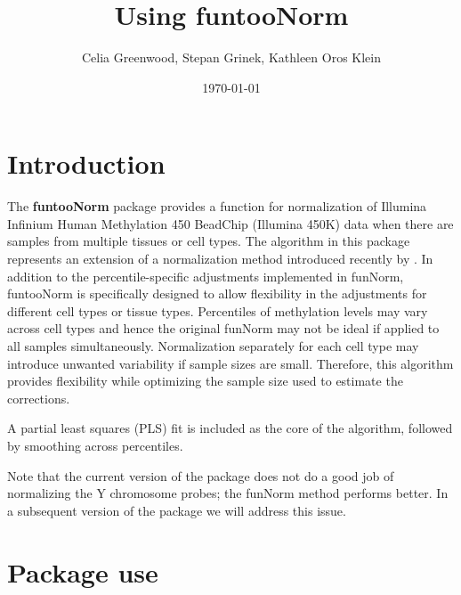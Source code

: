 \documentclass{article}
\title{Using funtooNorm}
\author{Celia Greenwood, Stepan Grinek, Kathleen Oros Klein}
\date{\today}
\begin{document}


\maketitle



\section{Introduction}


The \textbf{funtooNorm} package provides  a function for normalization of Illumina Infinium Human Methylation 450 BeadChip (Illumina 450K) data when there are samples from multiple tissues or cell types. 
The algorithm in this package represents an extension of a normalization method introduced recently by
\cite{Fortin2014, Aryee2014}. 
In addition to the percentile-specific adjustments implemented in funNorm, funtooNorm is specifically designed to allow flexibility in the adjustments for different cell types or tissue types.  
Percentiles of methylation levels may vary across cell types and hence the original funNorm may not be ideal if applied to all samples simultaneously.  
Normalization separately for each cell type may introduce unwanted variability if sample sizes are small.
Therefore, this algorithm provides flexibility while optimizing the sample size used to estimate the corrections.

A partial least squares (PLS) fit is included as the core of the algorithm, followed by smoothing across percentiles. 

Note that the current version of the package does not do a good job of normalizing the Y chromosome probes; the funNorm method performs better.  
In a subsequent version of the package we will address this issue. 

\section{Package use}
\end{document}
